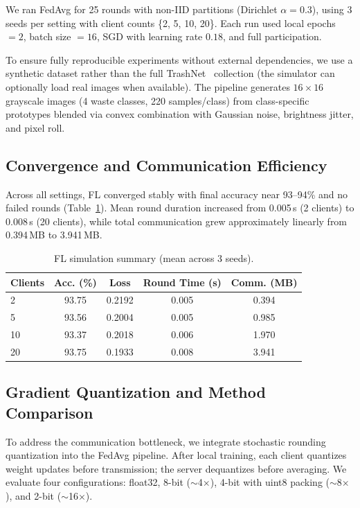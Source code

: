 We ran FedAvg for 25 rounds with non-IID partitions (Dirichlet $\alpha=0.3$), using 3 seeds per setting with client counts \{2, 5, 10, 20\}. Each run used local epochs $=2$, batch size $=16$, SGD with learning rate $0.18$, and full participation.

To ensure fully reproducible experiments without external dependencies, we use a synthetic dataset rather than the full TrashNet~\cite{thung2016trashnet} collection (the simulator can optionally load real images when available). The pipeline generates $16\times16$ grayscale images (4 waste classes, 220 samples/class) from class-specific prototypes blended via convex combination with Gaussian noise, brightness jitter, and pixel roll.

\subsection{Convergence and Communication Efficiency}
Across all settings, FL converged stably with final accuracy near 93--94\% and no failed rounds (Table~\ref{tab:fl-summary}). Mean round duration increased from 0.005\,s (2 clients) to 0.008\,s (20 clients), while total communication grew approximately linearly from 0.394\,MB to 3.941\,MB.

\begin{table}[t]
\centering
\footnotesize
\caption{FL simulation summary (mean across 3 seeds).}
\label{tab:fl-summary}
\begin{tabular}{lcccc}
\toprule
Clients & Acc. (\%) & Loss & Round Time (s) & Comm. (MB) \\
\midrule
2 & 93.75 & 0.2192 & 0.005 & 0.394 \\
5 & 93.56 & 0.2004 & 0.005 & 0.985 \\
10 & 93.37 & 0.2018 & 0.006 & 1.970 \\
20 & 93.75 & 0.1933 & 0.008 & 3.941 \\
\bottomrule
\end{tabular}
\end{table}

\subsection{Gradient Quantization and Method Comparison}
\label{sec:quantization}

To address the communication bottleneck, we integrate stochastic rounding
quantization into the FedAvg pipeline. After local training, each client
quantizes weight updates before transmission; the server dequantizes before
averaging. We evaluate four configurations: float32, 8-bit ($\sim$4$\times$),
4-bit with uint8 packing ($\sim$8$\times$), and 2-bit ($\sim$16$\times$).

